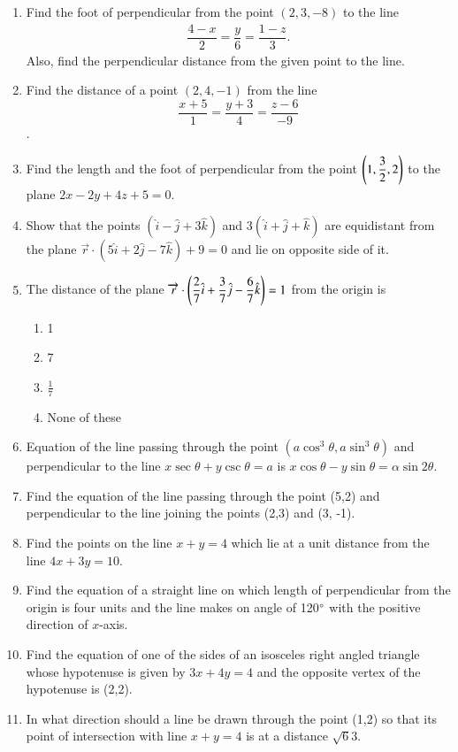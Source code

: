 \begin{enumerate}[label=\thesubsection.\arabic*,ref=\thesubsection.\theenumi]
\item Find the foot of perpendicular from the point $(2,3,-8)$ to the line  
\begin{align*}
	\dfrac{4-x}{2}=\dfrac{y}{6}=\dfrac{1-z}{3}.
\end{align*}
	Also, find the perpendicular distance from the given point to the line.
\item Find the distance of a point $(2,4,-1)$ from the line $$\frac{x+5}{1}=\frac{y+3}{4}=\frac{z-6}{-9}$$.
\item Find the length and the foot of perpendicular from the point $ \left(1,\dfrac{3}{2} ,2 \right)$ to the plane $2x-2y+4z+5=0.$
\item Show that the points $(\hat{i}-\hat{j}+3\hat{k})$ and $3(\hat{i}+\hat{j}+\hat{k})$ are equidistant from the plane $\overrightarrow{r} \cdot (5\hat{i}+2\hat{j}-7\hat{k})+9=0$ and lie on opposite side of it.
\item The distance of the plane $\overrightarrow{r} \cdot \left( \dfrac{2}{7}\hat{i}+\dfrac{3}{7}\hat{j}-\dfrac{6}{7}\hat{k}\right)=1$ from the origin is 
\begin{enumerate}
	\item 1
	\item 7
	\item $\frac{1}{7}$
	\item None of these	
\end{enumerate}
\item Equation of the line passing through the point $(a\cos^3\theta, a\sin^3\theta)$ and perpendicular to the line $x\sec\theta+y\csc\theta=a$ is $x\cos\theta-y\sin\theta=\alpha\sin2\theta$.
\item Find the equation of the line passing through the point (5,2) and perpendicular to the line joining the points (2,3) and (3, -1).
\item Find the points on the line $x+y=4$ which lie at a unit distance from the line $4x+3y=10$.
\item Find the equation of a straight line on which length of perpendicular from the origin is four units and the line makes on angle of 120$\degree$ with the positive direction of $x$-axis. 
\item Find the equation of one of the sides of an isosceles right angled triangle whose hypotenuse is given by $3x+4y=4$ and the opposite vertex of the hypotenuse is (2,2).
\item In what direction should a line be drawn through the point (1,2) so that its point of intersection with line $x+y=4$ is at a distance $\sqrt{6}{3}$. 

\end{enumerate}

